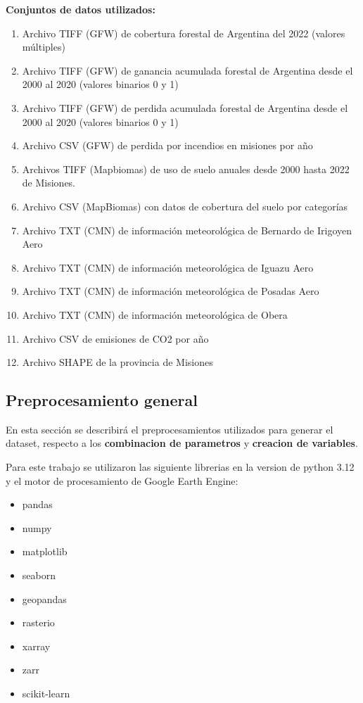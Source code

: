 \documentclass[11pt]{article}
\begin{document}
\textbf{Conjuntos de datos utilizados:
}
\begin{enumerate}
    \item     Archivo TIFF (GFW) de cobertura forestal de Argentina del 2022 (valores múltiples)
    \item Archivo TIFF (GFW) de ganancia acumulada forestal de Argentina desde el 2000 al 2020 (valores binarios 0 y 1)
    \item Archivo TIFF (GFW) de perdida acumulada forestal de Argentina desde el 2000 al 2020 (valores binarios 0 y 1)
    \item Archivo CSV  (GFW) de perdida por incendios en misiones por año
    \item Archivos TIFF (Mapbiomas) de uso de suelo anuales desde 2000 hasta 2022 de Misiones. 
    \item Archivo CSV (MapBiomas) con datos de cobertura del suelo por categorías
    \item Archivo TXT (CMN) de información meteorológica de Bernardo de Irigoyen Aero 
    \item  Archivo TXT (CMN) de información meteorológica de Iguazu Aero    
    \item Archivo TXT (CMN) de información meteorológica de Posadas Aero    
    \item Archivo TXT (CMN) de información meteorológica de  Obera
    \item Archivo CSV de emisiones de CO2 por año
    \item Archivo SHAPE de la provincia de Misiones
\end{enumerate}



\subsection{Preprocesamiento general}
En esta sección se describirá el preprocesamientos utilizados para generar el dataset, respecto a los \textbf{combinacion de parametros} y \textbf{creacion de variables}.

Para este trabajo se utilizaron las siguiente librerias en la version de python 3.12 y el motor de procesamiento de Google Earth Engine:
\begin{itemize}
    \item pandas
    \item numpy
    \item matplotlib
    \item seaborn
    \item geopandas
    \item rasterio
    \item xarray
    \item zarr
    \item scikit-learn
\end{itemize}
\end{document}

